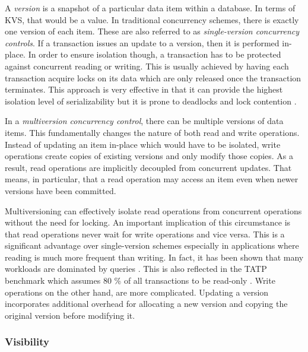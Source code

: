 A \emph{version} is a snapshot of a particular data item within a database. In
terms of KVS, that would be a value. In traditional concurrency schemes, there
is exactly one version of each item. These are also referred to as
\emph{single-version concurrency controls}. If a transaction issues an update to
a version, then it is performed in-place. In order to ensure isolation though, a
transaction has to be protected against concurrent reading or writing. This is
usually achieved by having each transaction acquire locks on its data which are
only released once the transaction terminates. This approach is very effective
in that it can provide the highest isolation level of serializability but it is
prone to deadlocks and lock contention \cite{berenson1995critique}.

In a \emph{multiversion concurrency control}, there can be multiple versions of
data items. This fundamentally changes the nature of both read and write
operations. Instead of updating an item in-place which would have to be
isolated, write operations create copies of existing versions and only modify
those copies. As a result, read operations are implicitly decoupled from
concurrent updates. That means, in particular, that a read operation may access
an item even when newer versions have been committed.


Multiversioning can effectively isolate read operations from concurrent
operations without the need for locking. An important implication of this
circumstance is that read operations never wait for write operations and vice
versa. This is a significant advantage over single-version schemes especially in
applications where reading is much more frequent than writing. In fact, it has
been shown that many workloads are dominated by queries \cite{krueger2011fast,
andrei2017sap}. This is also reflected in the TATP benchmark which assumes 80 \%
of all transactions to be read-only \cite{larson2011high}. Write operations on
the other hand, are more complicated. Updating a version incorporates additional
overhead for allocating a new version and copying the original version before
modifying it.

\subsubsection{Visibility}

